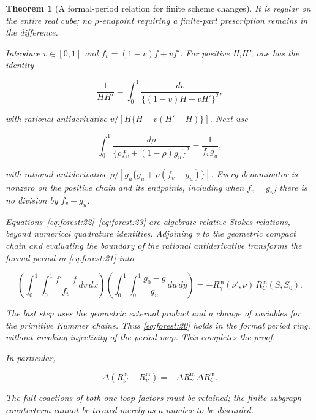 \documentclass[11pt,a4paper,oneside]{article}
\theoremstyle{plain}
\newtheorem{theorem}{Theorem}[section]
\theoremstyle{definition}
\theoremstyle{remark}
\numberwithin{equation}{section}
\begin{document}
\begin{theorem}[A formal-period relation for finite scheme changes]
It is regular on the entire real cube; no \(\rho \)-endpoint requiring a finite-part prescription remains in the difference.

Introduce \(v\in [0,1]\) and \(f_v=(1- v)f+vf'\). For positive H,H', one has the identity

\begin{equation}
\frac1{HH'}=\int_0^1\frac{dv}{\{(1-v)H+vH'\}^2},              \label{eq:forest:22}
\end{equation}

with rational antiderivative \(v/[H\{H+v(H'- H)\}]\). Next use

\begin{equation}
\int_0^1\frac{d\rho}{\{\rho f_v+(1-\rho)g_u\}^2}
       =\frac1{f_vg_u},                                       \label{eq:forest:23}
\end{equation}

with rational antiderivative \(\rho /[g_u\{g_u+\rho (f_v- g_u)\}]\). Every denominator is nonzero on the positive chain and its endpoints, including when \(f_v=g_u\); there is no division by \(f_v- g_u\).

Equations~\eqref{eq:forest:22}--\eqref{eq:forest:23} are algebraic relative Stokes relations, beyond numerical quadrature identities. Adjoining v to the geometric compact chain and evaluating the boundary of the rational antiderivative transforms the formal period in \eqref{eq:forest:21} into

\begin{equation}
\left(\int_0^1\!\!\int_0^1\frac{f'-f}{f_v}\,dv\,dx\right)
 \left(\int_0^1\!\!\int_0^1\frac{g_0-g}{g_u}\,du\,dy\right)
       =-R_\gamma^{\mathfrak m}(\nu',\nu)\,
                         R_C^{\mathfrak m}(S,S_0).
\end{equation}

The last step uses the geometric external product and a change of variables for the primitive Kummer chains. Thus \eqref{eq:forest:20} holds in the formal period ring, without invoking injectivity of the period map. This completes the proof.

In particular,

\begin{equation}
\Delta(R_{\nu'}^{\mathfrak m}-R_\nu^{\mathfrak m})
       =-\Delta R_\gamma^{\mathfrak m}\,\Delta R_C^{\mathfrak m}.            \label{eq:forest:24}
\end{equation}

The full coactions of both one-loop factors must be retained; the finite subgraph counterterm cannot be treated merely as a number to be discarded.


\end{theorem}
\end{document}
